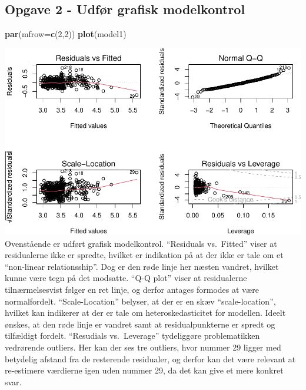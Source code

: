 \documentclass[
]{article}
\newenvironment{Shaded}{\begin{snugshade}}{\end{snugshade}}
\newcommand{\AttributeTok}[1]{\textcolor[rgb]{0.13,0.29,0.53}{#1}}
\newcommand{\DecValTok}[1]{\textcolor[rgb]{0.00,0.00,0.81}{#1}}
\newcommand{\FunctionTok}[1]{\textcolor[rgb]{0.13,0.29,0.53}{\textbf{#1}}}
\newcommand{\NormalTok}[1]{#1}
\begin{document}
\hypertarget{opgave-2---udfuxf8r-grafisk-modelkontrol}{%
\subsection{Opgave 2 - Udfør grafisk
modelkontrol}\label{opgave-2---udfuxf8r-grafisk-modelkontrol}}

\begin{Shaded}
\begin{Highlighting}[]
\FunctionTok{par}\NormalTok{(}\AttributeTok{mfrow=}\FunctionTok{c}\NormalTok{(}\DecValTok{2}\NormalTok{,}\DecValTok{2}\NormalTok{))}
\FunctionTok{plot}\NormalTok{(model1)}
\end{Highlighting}
\end{Shaded}

\includegraphics{Eksamensopgave-1_files/figure-latex/unnamed-chunk-3-1.pdf}
Ovenstående er udført grafisk modelkontrol. ``Residuals vs.~Fitted''
viser at residualerne ikke er spredte, hvilket er indikation på at der
ikke er tale om et ``non-linear relationsship''. Dog er den røde linje
her næsten vandret, hvilket kunne være tegn på det modsatte. ``Q-Q
plot'' viser at residualerne tilnærmelsesvist følger en ret linje, og
derfor antages formodes at være normalfordelt. ``Scale-Location''
belyser, at der er en skæv ``scale-location'', hvilket kan indikerer at
der er tale om heteroskedasticitet for modellen. Ideelt ønskes, at den
røde linje er vandret samt at residualpunkterne er spredt og tilfældigt
fordelt. ``Resudials vs.~Leverage'' tydeliggøre problematikken
vedrørende outliers. Her kan der ses tre outliers, hvor nummer 29 ligger
med betydelig afstand fra de resterende residualer, og derfor kan det
være relevant at re-estimere værdierne igen uden nummer 29, da det kan
give et mere konkret svar.
\end{document}
